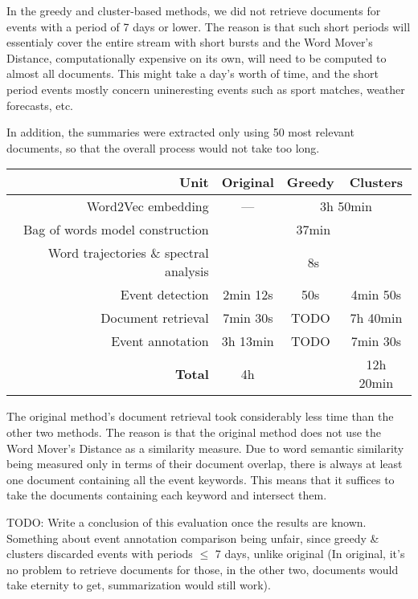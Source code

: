 In the greedy and cluster-based methods, we did not retrieve documents for events with a period of 7 days or lower. The reason is that such short periods will essentialy cover the entire stream with short bursts and the Word Mover's Distance, computationally expensive on its own, will need to be computed to almost all documents. This might take a day's worth of time, and the short period events mostly concern unineresting events such as sport matches, weather forecasts, etc.

In addition, the summaries were extracted only using 50 most relevant documents, so that the overall process would not take too long.

\hspace{\fill}

\begin{minipage}{\linewidth}
\centering
\begin{tabular}{ r c c c }\toprule[1.5pt]
\bf Unit & \bf Original & \bf Greedy & \bf Clusters \\ \midrule
Word2Vec embedding & --- & \multicolumn{2}{c}{3h 50min} \\
Bag of words model construction & \multicolumn{3}{c}{37min} \\
Word trajectories \& spectral analysis & \multicolumn{3}{c}{8s} \\
Event detection & 2min 12s & 50s & 4min 50s \\
Document retrieval & 7min 30s & {\color{red} TODO} & 7h 40min \\
Event annotation & 3h 13min & {\color{red} TODO} & 7min 30s \\ \midrule
\bf Total & 4h & & 12h 20min\\ \bottomrule[1.25pt]

\end{tabular}\par
{} \label{tab:title}
\end{minipage}

\hspace{\fill}

The original method's document retrieval took considerably less time than the other two methods. The reason is that the original method does not use the Word Mover's Distance as a similarity measure. Due to word semantic similarity being measured only in terms of their document overlap, there is always at least one document containing all the event keywords. This means that it suffices to take the documents containing each keyword and intersect them.

{\color{red} TODO: Write a conclusion of this evaluation once the results are known. Something about event annotation comparison being unfair, since greedy \& clusters discarded events with periods $\leq$ 7 days, unlike original (In original, it's no problem to retrieve documents for those, in the other two, documents would take eternity to get, summarization would still work).}

